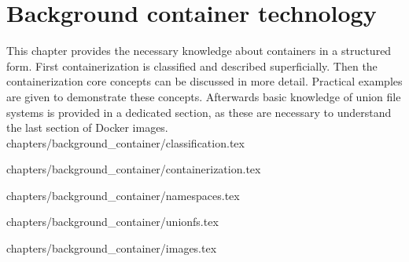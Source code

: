 \chapter{Background container technology}
\label{ch:back}

This chapter provides the necessary knowledge about containers in a structured form.
First containerization is classified and described superficially. Then the containerization core concepts can be discussed in more detail.
Practical examples are given to demonstrate these concepts.
Afterwards basic knowledge of union file systems is provided in a dedicated section, as these are necessary to understand the last section of Docker images.
 {chapters/background_container/classification.tex}

 {chapters/background_container/containerization.tex}

 {chapters/background_container/namespaces.tex}


 {chapters/background_container/unionfs.tex}

 {chapters/background_container/images.tex}

















